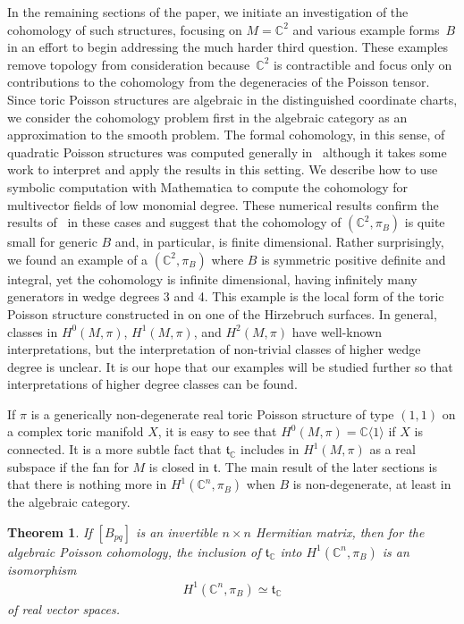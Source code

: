 \documentclass[10pt,a4paper]{amsart}
\numberwithin{equation}{section}
\newtheorem{Theorem}{Theorem}[section]
\begin{document}
In the remaining sections of the paper, we initiate an investigation of the cohomology of such structures, focusing on $M={\mathbb C}^2$ and various example forms~$B$ in an ef\/fort to begin addressing the much harder third question. These examples remove topology from consideration because~${\mathbb C}^2$ is contractible and focus only on contributions to the cohomology from the degeneracies of the Poisson tensor. Since toric Poisson structures are algebraic in the distinguished coordinate charts, we consider the cohomology problem f\/irst in the algebraic category as an approximation to the smooth problem. The formal cohomology, in this sense, of quadratic Poisson structures was computed generally in~\cite{Monnier} although it takes some work to interpret and apply the results in this setting. We describe how to use symbolic computation with Mathematica to compute the cohomology for multivector f\/ields of low monomial degree. These numerical results conf\/irm the results of~\cite{Monnier} in these cases and suggest that the cohomology of $({\mathbb C}^2,\pi_B)$ is quite small for generic $B$ and, in particular, is f\/inite dimensional. Rather surprisingly, we found an example of a $({\mathbb C}^2,\pi_B)$ where $B$ is symmetric positive def\/inite and integral, yet the cohomology is inf\/inite dimensional, having inf\/initely many generators in wedge degrees 3 and 4. This example is the local form of the toric Poisson structure constructed in \cite{Caine} on one of the Hirzebruch surfaces. In general, classes in $H^0(M,\pi)$, $H^1(M,\pi)$, and $H^2(M,\pi)$ have well-known interpretations, but the interpretation of non-trivial classes of higher wedge degree is unclear. It is our hope that our examples will be studied further so that interpretations of higher degree classes can be found.

If $\pi$ is a generically non-degenerate real toric Poisson structure of type $(1,1)$ on a complex toric manifold $X$, it is easy to see that $H^0(M,\pi)={\mathbb C}\langle 1\rangle$ if $X$ is connected. It is a more subtle fact that ${\mathfrak t}_{\mathbb C}$ includes in $H^1(M,\pi)$ as a real subspace if the fan for $M$ is closed in ${\mathfrak t}$. The main result of the later sections is that there is nothing more in $H^1({\mathbb C}^n,\pi_B)$ when $B$ is non-degenerate, at least in the algebraic category.

\begin{Theorem}\label{3rd_main_theorem}
If $[B_{pq}]$ is an invertible $n\times n$ Hermitian matrix, then for the algebraic Poisson cohomology, the inclusion of ${\mathfrak t}_{\mathbb C}$ into $H^1({\mathbb C}^n,\pi_B)$ is an isomorphism
\begin{gather*}
H^1({\mathbb C}^n,\pi_B)\simeq {\mathfrak t}_{\mathbb C}
\end{gather*}
of real vector spaces.
\end{Theorem}
\end{document}
